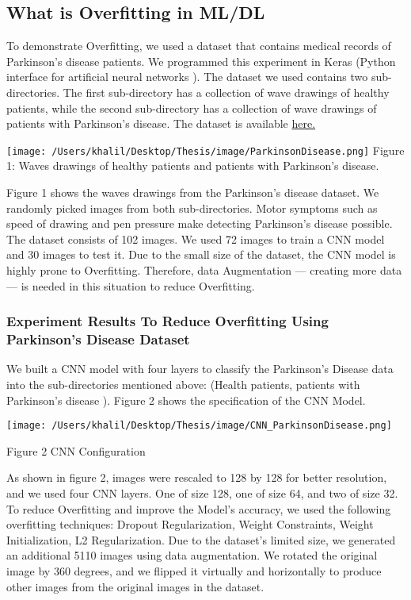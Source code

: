 \documentclass[oneside,12pt,article]{article}
\begin{document}
\subsection{What is Overfitting in ML/DL}
To demonstrate Overfitting, we used a dataset that contains medical records of Parkinson's disease patients. We programmed this experiment in Keras (Python interface for artificial neural networks \cite{ketkar2017introduction}). The dataset we used contains two sub-directories. The first sub-directory has a collection of wave drawings of healthy patients, while the second sub-directory has a collection of wave drawings of patients with Parkinson's disease. The dataset is available \cite{basel99_2021} \href{https://www.kaggle.com/basel99/parkinson-s-disease-detection/data}{here.} 
 

\begin{center}
\texttt{[image: /Users/khalil/Desktop/Thesis/image/ParkinsonDisease.png]} 
\newline
Figure 1: Waves drawings of healthy patients and patients with Parkinson's disease. 
\end{center}
Figure 1 shows the waves drawings from the Parkinson's disease dataset. We randomly picked images from both sub-directories. Motor symptoms such as speed of drawing and pen pressure make detecting Parkinson's disease possible. The dataset consists of 102 images. We used 72 images to train a CNN model and 30 images to test it. Due to the small size of the dataset, the CNN model is highly prone to Overfitting. Therefore, data Augmentation — creating more data — is needed in this situation to reduce Overfitting.


\subsubsection{Experiment Results To Reduce Overfitting Using Parkinson's Disease Dataset }
We built a CNN model with four layers to classify the Parkinson's Disease data into the sub-directories mentioned above: (Health patients, patients with Parkinson's disease ). Figure 2 shows the specification of the CNN Model. 
\begin{center}
\texttt{[image: /Users/khalil/Desktop/Thesis/image/CNN\_ParkinsonDisease.png]} 
 \begin{center}
Figure 2 CNN Configuration
\end{center} 
\end{center} 
As shown in figure 2, images were rescaled to 128 by 128 for better resolution, and we used four CNN layers. One of size 128, one of size 64, and two of size 32. To reduce Overfitting and improve the Model's accuracy, we used the following overfitting techniques: Dropout Regularization, Weight Constraints, Weight Initialization, L2 Regularization. Due to the dataset's limited size, we generated an additional 5110 images using data augmentation. We rotated the original image by 360 degrees, and we flipped it virtually and horizontally to produce other images from the original images in the dataset.
\end{document}
